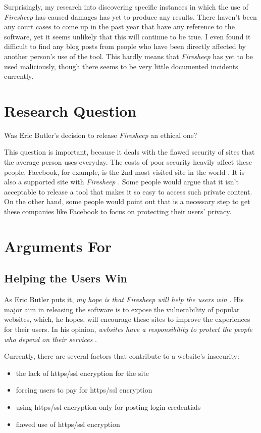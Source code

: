 \documentclass[11pt]{article}
\begin{document}
\begin{multicols}{2}
Surprisingly, my research into discovering specific instances in which the use of \emph{Firesheep} has caused damages has yet to produce any results. There haven't been any court cases to come up in the past year that have any reference to the software, yet it seems unlikely that this will continue to be true. I even found it difficult to find any blog posts from people who have been directly affected by another person's use of the tool. This hardly means that \emph{Firesheep} has yet to be used maliciously, though there seems to be very little documented incidents currently. 

\section{Research Question}
Was Eric Butler's decision to release \emph{Firesheep} an ethical one?

This question is important, because it deals with the flawed security of sites that the average person uses everyday. The costs of poor security heavily affect these people. Facebook, for example, is the 2nd most visited site in the world \cite{alexa}. It is also a supported site with \emph{Firesheep} \cite{github}. Some people would argue that it isn't acceptable to release a tool that makes it so easy to access such private content. On the other hand,  some people would point out that is a necessary step to get these companies like Facebook to focus on protecting their users' privacy.

\section{Arguments For}
\subsection{Helping the Users Win}
As Eric Butler  puts it, \emph{my hope is that Firesheep will help the users win} \cite{codebutler_main}. His major aim in releasing the software is to expose the vulnerability of popular websites, which, he hopes, will encourage these sites to improve the experiences for their users. In his opinion, \emph{websites have a responsibility to protect the people who depend on their services} \cite{codebutler_main}.

Currently, there are several factors that contribute to a website's insecurity: \cite{codebutler_blog_1}
\begin{itemize}
  \item
  the lack of https/ssl encryption for the site
  \item
  forcing users to pay for https/ssl encryption
  \item
  using https/ssl encryption only for posting login credentials
  \item
  flawed use of https/ssl encryption
\end{itemize}


\end{multicols}
\end{document}
